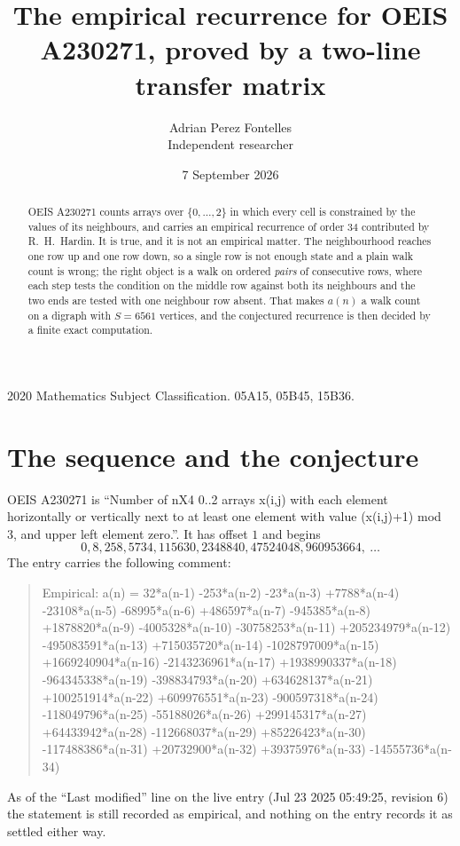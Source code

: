 \documentclass[11pt,a4paper]{article}
\title{The empirical recurrence for OEIS A230271, proved by a two-line transfer matrix}
\author{Adrian Perez Fontelles\\ \small Independent researcher}
\date{7 September 2026}
\theoremstyle{plain}
\theoremstyle{definition}
\begin{document}
\maketitle

\begin{abstract}
OEIS A230271 counts arrays over $\{0,\dots,2\}$ in which every cell is constrained by the
values of its neighbours, and carries an empirical recurrence of order $34$ contributed
by R.~H.~Hardin. It is true, and it is not an empirical matter. The neighbourhood reaches one
row up and one row down, so a single row is not enough state and a plain walk count
is wrong; the right object is a walk on ordered \emph{pairs} of consecutive rows, where
each step tests the condition on the middle row against both its neighbours and the two
ends are tested with one neighbour row absent. That makes $a(n)$ a walk count on a digraph
with $S=6561$ vertices, and the conjectured recurrence is then decided by a finite exact
computation.
\end{abstract}

\noindent\small 2020 Mathematics Subject Classification. 05A15, 05B45, 15B36.\normalsize

\section{The sequence and the conjecture}

OEIS A230271 is ``Number of nX4 0..2 arrays x(i,j) with each element horizontally or vertically next to at least one element with value (x(i,j)+1) mod 3, and upper left element zero.''. It has offset $1$ and begins
\[
0, 8, 258, 5734, 115630, 2348840, 47524048, 960953664,\ \dots
\]
The entry carries the following comment:
\begin{quote}\small
Empirical: a(n) = 32*a(n-1) -253*a(n-2) -23*a(n-3) +7788*a(n-4) -23108*a(n-5) -68995*a(n-6) +486597*a(n-7) -945385*a(n-8) +1878820*a(n-9) -4005328*a(n-10) -30758253*a(n-11) +205234979*a(n-12) -495083591*a(n-13) +715035720*a(n-14) -1028797009*a(n-15) +1669240904*a(n-16) -2143236961*a(n-17) +1938990337*a(n-18) -964345338*a(n-19) -398834793*a(n-20) +634628137*a(n-21) +100251914*a(n-22) +609976551*a(n-23) -900597318*a(n-24) -118049796*a(n-25) -55188026*a(n-26) +299145317*a(n-27) +64433942*a(n-28) -112668037*a(n-29) +85226423*a(n-30) -117488386*a(n-31) +20732900*a(n-32) +39375976*a(n-33) -14555736*a(n-34)
\end{quote}
As of the ``Last modified'' line on the live entry (Jul 23 2025 05:49:25, revision 6) the statement is
still recorded as empirical, and nothing on the entry records it as settled either way.
\end{document}
